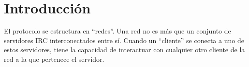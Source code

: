 \chapter{Introducción}


El protocolo se estructura en “redes”. Una red no es más que un conjunto de servidores IRC interconectados entre sí. Cuando un “cliente” se conecta a uno de estos servidores, tiene la capacidad de interactuar con cualquier otro cliente de la red a la que pertenece el servidor.
